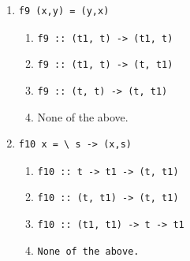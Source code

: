 \documentclass[12pt]{article}
\begin{document}
\begin{enumerate}[resume]
\item \begin{verbatim}
f9 (x,y) = (y,x)
\end{verbatim}
\begin{enumerate}
\item {\tt f9 :: (t1, t) -> (t1, t)}
\item {\tt f9 :: (t1, t) -> (t, t1)}
\item {\tt f9 :: (t, t) -> (t, t1)}
\item None of the above.
\end{enumerate}

\item \begin{verbatim}
f10 x = \ s -> (x,s)
\end{verbatim}
\begin{enumerate}
\item {\tt f10 :: t -> t1 -> (t, t1)}
\item {\tt f10 :: (t, t1) -> (t, t1)}
\item {\tt f10 :: (t1, t1) -> t -> t1}
\item {\tt None of the above.}
\end{enumerate}

\end{enumerate}
\end{document}
